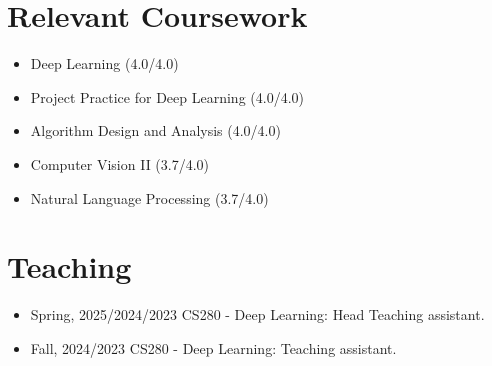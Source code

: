 \documentclass[letterpaper,11pt]{article}
\newcommand{\resumeItem}[1]{
  \item\small{
    {#1 \vspace{-2pt}}
  }
}
\newcommand{\resumeSubHeadingListStart}{\begin{itemize}[leftmargin=0.0in, label={}]}
\newcommand{\resumeSubHeadingListEnd}{\end{itemize}}
\newcommand{\resumeItemListStart}{\begin{itemize}}
\newcommand{\resumeItemListEnd}{\end{itemize}\vspace{-5pt}}
\begin{document}
\section{Relevant Coursework}
        \begin{multicols}{2}
            \begin{itemize}[itemsep=-3pt, parsep=3pt]
                \item\small Deep Learning (4.0/4.0)
                \item\small Project Practice for Deep Learning (4.0/4.0)
                \item Algorithm Design and Analysis (4.0/4.0)
                \item Computer Vision II (3.7/4.0)
                \item Natural Language Processing (3.7/4.0)
                
            \end{itemize}
        \end{multicols}
        \vspace{-2pt}

\section{Teaching}
\resumeItemListStart
\resumeItem{Spring, 2025/2024/2023 CS280 - Deep Learning: Head Teaching assistant.}
\resumeItem{Fall,  2024/2023 CS280 - Deep Learning: Teaching assistant.}
\resumeItemListEnd
\vspace{-6pt}
\end{document}
